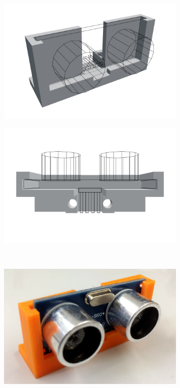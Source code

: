 \documentclass[a4paper, 12pt]{scrartcl}
\begin{document}
\begin{figure}[H]
	\centering
	\begin{subfigure}{.5\textwidth}
		\centering
		\includegraphics[width=\textwidth]{../3D-Druck_Modelle/Sensorhalterung.png}
	\end{subfigure}%
	\begin{subfigure}{.5\textwidth}
		\centering
		\includegraphics[width=\textwidth]{../3D-Druck_Modelle/Sensorhalterung_Top.png}
	\end{subfigure}\\
	\begin{subfigure}{.5\textwidth}
		\centering
		\includegraphics[width=\textwidth]{../bilder_videos/Sensorhalterung.png}

\end{subfigure}
\end{figure}
\end{document}
